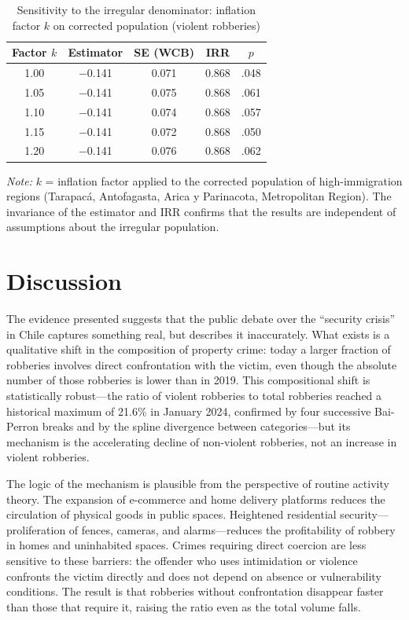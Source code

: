 \documentclass[pdflatex,sn-basic]{sn-jnl}
\newcommand{\tablenote}[1]{%
  \vspace{2pt}\par
  {\footnotesize\textit{Note:} #1\par}
}
\begin{document}
\begin{table}[htbp]
\centering
\caption{Sensitivity to the irregular denominator: inflation factor $k$ on
corrected population (violent robberies)}
\label{tab:sensipop}
\small
\begin{tabular}{ccccc}
\toprule
\textbf{Factor $k$} & \textbf{Estimator} & \textbf{SE (WCB)} & \textbf{IRR} & $p$ \\
\midrule
1.00 & $-$0.141 & 0.071 & 0.868 & .048 \\
1.05 & $-$0.141 & 0.075 & 0.868 & .061 \\
1.10 & $-$0.141 & 0.074 & 0.868 & .057 \\
1.15 & $-$0.141 & 0.072 & 0.868 & .050 \\
1.20 & $-$0.141 & 0.076 & 0.868 & .062 \\
\bottomrule
\end{tabular}
\tablenote{$k$ = inflation factor applied to the corrected population of high-immigration
regions (Tarapac\'a, Antofagasta, Arica y Parinacota, Metropolitan Region). The invariance of the estimator and IRR confirms that the results are
independent of assumptions about the irregular population.}
\end{table}


\section{Discussion}
\label{sec:discusion}

The evidence presented suggests that the public debate over the ``security crisis''
in Chile captures something real, but describes it inaccurately. What exists is a
qualitative shift in the composition of property crime: today a larger
fraction of robberies involves direct confrontation with the victim, even though the
absolute number of those robberies is lower than in 2019. This compositional shift is
statistically robust---the ratio of violent robberies to total robberies reached a historical
maximum of 21.6\% in January 2024, confirmed by four successive
Bai-Perron breaks and by the spline divergence between categories---but its mechanism
is the accelerating decline of non-violent robberies, not an increase in
violent robberies.

The logic of the mechanism is plausible from the perspective of routine activity theory.
The expansion of e-commerce and home delivery platforms
reduces the circulation of physical goods in public spaces. Heightened residential
security---proliferation of fences, cameras, and alarms---reduces the profitability of
robbery in homes and uninhabited spaces. Crimes requiring direct coercion
are less sensitive to these barriers: the offender who uses intimidation or violence
confronts the victim directly and does not depend on absence or vulnerability conditions. The
result is that robberies without confrontation disappear faster than those
that require it, raising the ratio even as the total volume falls.
\end{document}
